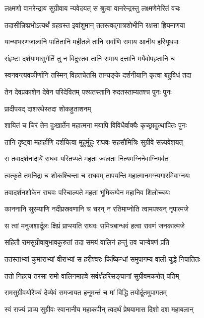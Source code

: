 \twolineshloka
{लक्ष्मणो वानरेन्द्राय सुग्रीवाय न्यवेदयत्}
{स श्रुत्वा वानरेन्द्रस्तु लक्ष्मणेनेरितं वचः} %

\twolineshloka
{तदासीन्निष्प्रभोऽत्यर्थं ग्रहग्रस्त इवांशुमान्}
{ततस्त्वद्गात्रशोभीनि रक्षसा ह्रियमाणया} %

\twolineshloka
{यान्याभरणजालानि पातितानि महीतले}
{तानि सर्वाणि रामाय आनीय हरियूथपाः} %

\twolineshloka
{संहृष्टा दर्शयामासुर्गतिं तु न विदुस्तव}
{तानि रामाय दत्तानि मयैवोपहृतानि च} %

\twolineshloka
{स्वनवन्त्यवकीर्णानि तस्मिन् विहतचेतसि}
{तान्यङ्के दर्शनीयानि कृत्वा बहुविधं तदा} %

\twolineshloka
{तेन देवप्रकाशेन देवेन परिदेवितम्}
{पश्यतस्तानि रुदतस्ताम्यतश्च पुनः पुनः} %

\onelineshloka
{प्रादीपयद् दाशरथेस्तदा शोकहुताशनम्} %

\twolineshloka
{शायितं च चिरं तेन दुःखार्तेन महात्मना}
{मयापि विविधैर्वाक्यैः कृच्छ्रादुत्थापितः पुनः} %

\twolineshloka
{तानि दृष्ट्वा महार्हाणि दर्शयित्वा मुहुर्मुहुः}
{राघवः सहसौमित्रिः सुग्रीवे सन्न्यवेशयत्} %

\twolineshloka
{स तवादर्शनादार्ये राघवः परितप्यते}
{महता ज्वलता नित्यमग्निनेवाग्निपर्वतः} %

\twolineshloka
{त्वत्कृते तमनिद्रा च शोकश्चिन्ता च राघवम्}
{तापयन्ति महात्मानमग्न्यगारमिवाग्नयः} %

\twolineshloka
{तवादर्शनशोकेन राघवः परिचाल्यते}
{महता भूमिकम्पेन महानिव शिलोच्चयः} %

\twolineshloka
{काननानि सुरम्याणि नदीप्रस्रवणानि च}
{चरन् न रतिमाप्नोति त्वामपश्यन् नृपात्मजे} %

\twolineshloka
{स त्वां मनुजशार्दूलः क्षिप्रं प्राप्स्यति राघवः}
{समित्रबान्धवं हत्वा रावणं जनकात्मजे} %

\twolineshloka
{सहितौ रामसुग्रीवावुभावकुरुतां तदा}
{समयं वालिनं हन्तुं तव चान्वेषणं प्रति} %

\twolineshloka
{ततस्ताभ्यां कुमाराभ्यां वीराभ्यां स हरीश्वरः}
{किष्किन्धां समुपागम्य वाली युद्धे निपातितः} %

\twolineshloka
{ततो निहत्य तरसा रामो वालिनमाहवे}
{सर्वर्क्षहरिसङ्घानां सुग्रीवमकरोत् पतिम्} %

\twolineshloka
{रामसुग्रीवयोरैक्यं देव्येवं समजायत}
{हनूमन्तं च मां विद्धि तयोर्दूतमुपागतम्} %

\twolineshloka
{स्वं राज्यं प्राप्य सुग्रीवः स्वानानीय महाकपीन्}
{त्वदर्थं प्रेषयामास दिशो दश महाबलान्} %

